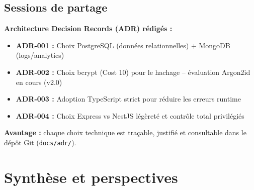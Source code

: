 \subsection{Sessions de partage}

\begin{tcolorbox}[colback=yellow!5!white,colframe=yellow!60!black,title=\textbf{Documentation et partage des décisions techniques}]
\textbf{Architecture Decision Records (ADR) rédigés :}
\begin{itemize}
    \item \textbf{ADR-001 :} Choix PostgreSQL (données relationnelles) + MongoDB (logs/analytics)
    \item \textbf{ADR-002 :} Choix bcrypt (Cost 10) pour le hachage -- évaluation Argon2id en cours (v2.0)
    \item \textbf{ADR-003 :} Adoption TypeScript strict pour réduire les erreurs runtime
    \item \textbf{ADR-004 :} Choix Express vs NestJS  légèreté et contrôle total privilégiés
\end{itemize}

\textbf{Avantage :} chaque choix technique est traçable, justifié et consultable dans le dépôt Git (\texttt{docs/adr/}).
\end{tcolorbox}

\section{Synthèse et perspectives}

